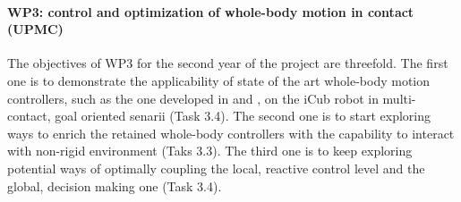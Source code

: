 \paragraph{WP3: control and optimization of whole-body motion in contact (UPMC)}

The objectives of WP3 for the second year of the project are threefold. The first one is to demonstrate the applicability of state of the art whole-body motion controllers, such as the one developed in \cite{salini2012} and \cite{delprete2013}, on the iCub robot in multi-contact, goal oriented senarii (Task 3.4). The second one is to start exploring ways to enrich the retained whole-body controllers with the capability to interact with non-rigid environment (Taks 3.3). The third one is to keep exploring potential ways of optimally coupling the local, reactive control level and the global, decision making one (Task 3.4).
